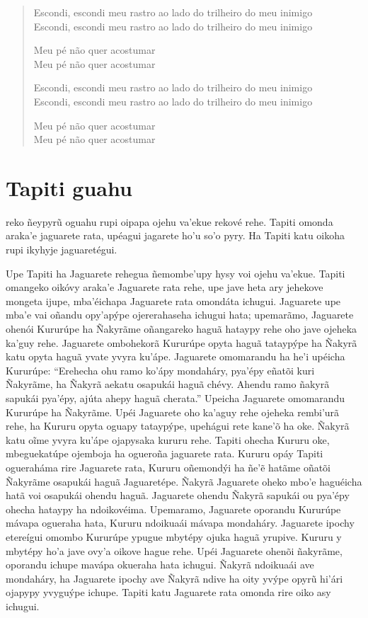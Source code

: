 \begin{verse}
Escondi, escondi meu rastro ao lado do trilheiro do \qb{}meu inimigo\\
Escondi, escondi meu rastro ao lado do trilheiro do \qb{}meu inimigo

Meu pé não quer acostumar\\
Meu pé não quer acostumar

Escondi, escondi meu rastro ao lado do trilheiro do \qb{}meu inimigo\\
Escondi, escondi meu rastro ao lado do trilheiro do \qb{}meu inimigo

Meu pé não quer acostumar\\
Meu pé não quer acostumar
\end{verse}

\chapter{Tapiti guahu}

 reko ñeypyrũ oguahu rupi oipapa ojehu va'ekue rekové rehe. Tapiti
omonda araka'e jaguarete rata, upéagui jagarete ho'u so'o pyry. Ha
Tapiti katu oikoha rupi ikyhyje jaguaretégui.

Upe Tapiti ha Jaguarete rehegua ñemombe'upy hysy voi ojehu va'ekue.
Tapiti omangeko oikóvy araka'e Jaguarete rata rehe, upe jave heta ary
jehekove mongeta ijupe, mba'éichapa Jaguarete rata omondáta ichugui.
Jaguarete upe mba'e vai oñandu opy'apýpe ojererahaseha ichugui hata;
upemarãmo, Jaguarete ohenói Kururúpe ha Ñakyrãme oñangareko haguã
hataypy rehe oho jave ojeheka ka'guy rehe. Jaguarete ombohekorã Kururúpe
opyta haguã tataypýpe ha Ñakyrã katu opyta haguã yvate yvyra ku'ápe.
Jaguarete omomarandu ha he'i upéicha Kururúpe: ``Erehecha ohu ramo
ko'ápy mondaháry, pya'épy eñatõi kuri Ñakyrãme, ha Ñakyrã aekatu
osapukái haguã chévy. Ahendu ramo ñakyrã sapukái pya'épy, ajúta ahepy
haguã cherata.'' Upeicha Jaguarete omomarandu Kururúpe ha Ñakyrãme. Upéi
Jaguarete oho ka'aguy rehe ojeheka rembi'urã rehe, ha Kururu opyta
oguapy tataypýpe, upehágui rete kane'õ ha oke. Ñakyrã katu oĩme yvyra
ku'ápe ojapysaka kururu rehe. Tapiti ohecha Kururu oke, mbeguekatúpe
ojemboja ha ogueroña jaguarete rata. Kururu opáy Tapiti ogueraháma rire
Jaguarete rata, Kururu oñemondýi ha ñe'ẽ hatãme oñatõi Ñakyrãme osapukái
haguã Jaguaretépe. Ñakyrã Jaguarete oheko mbo'e haguéicha hatã voi
osapukái ohendu haguã. Jaguarete ohendu Ñakyrã sapukái ou pya'épy ohecha
hataypy ha ndoikovéima. Upemaramo, Jaguarete oporandu Kururúpe mávapa
ogueraha hata, Kururu ndoikuaái mávapa mondaháry. Jaguarete ipochy
etereígui omombo Kururúpe ypugue mbytépy ojuka haguã yrupive. Kururu y
mbytépy ho'a jave ovy'a oikove hague rehe. Upéi Jaguarete ohenõi
ñakyrãme, oporandu ichupe mavápa okueraha hata ichugui. Ñakyrã ndoikuaái
ave mondaháry, ha Jaguarete ipochy ave Ñakyrã ndive ha oity yvýpe opyrũ
hi'ári ojapypy yvyguýpe ichupe. Tapiti katu Jaguarete rata omonda rire
oiko asy ichugui.

